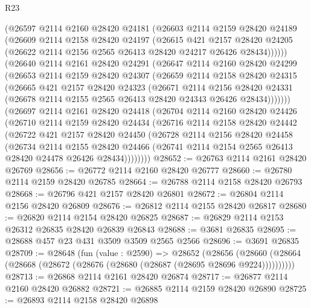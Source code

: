 \begin{lexlean}{R23}
\begin{coremodule}
      (@26597
        @2114
        @2160
        @28420
        @24181
        (@26603
          @2114
          @2159
          @28420
          @24189
          (@26609
            @2114
            @2158
            @28420
            @24197
            (@26615
              @421
              @2157
              @28420
              @24205
              (@26622 @2114 @2156 @2565 @26413 @28420 @24217 @26426 @28434))))))
    (@26640
      @2114
      @2161
      @28420
      @24291
      (@26647
        @2114
        @2160
        @28420
        @24299
        (@26653
          @2114
          @2159
          @28420
          @24307
          (@26659
            @2114
            @2158
            @28420
            @24315
            (@26665
              @421
              @2157
              @28420
              @24323
              (@26671
                @2114
                @2156
                @28420
                @24331
                (@26678 @2114 @2155 @2565 @26413 @28420 @24343 @26426 @28434)))))))
    (@26697
      @2114
      @2161
      @28420
      @24418
      (@26704
        @2114
        @2160
        @28420
        @24426
        (@26710
          @2114
          @2159
          @28420
          @24434
          (@26716
            @2114
            @2158
            @28420
            @24442
            (@26722
              @421
              @2157
              @28420
              @24450
              (@26728
                @2114
                @2156
                @28420
                @24458
                (@26734
                  @2114
                  @2155
                  @28420
                  @24466
                  (@26741 @2114 @2154 @2565 @26413 @28420 @24478 @26426 @28434))))))))
@28652 := @26763 @2114 @2161 @28420 @26769
@28656 := @26772 @2114 @2160 @28420 @26777
@28660 := @26780 @2114 @2159 @28420 @26785
@28664 := @26788 @2114 @2158 @28420 @26793
@28668 := @26796 @421 @2157 @28420 @26801
@28672 := @26804 @2114 @2156 @28420 @26809
@28676 := @26812 @2114 @2155 @28420 @26817
@28680 := @26820 @2114 @2154 @28420 @26825
@28687 := @26829 @2114 @2153 @26312 @26835 @28420 @26839 @26843
@28688 := @3681 @26835
@28695 := @28688 @457 @23 @431 @3509 @3509 @2565 @2566
@28696 := @3691 @26835
@28709 := @28648
    (fun (value : @2590) =>
    @28652
      (@28656 (@28660 (@28664 (@28668 (@28672 (@28676 (@28680 (@28687 (@28695 @28696 @9224))))))))))
@28713 := @26868 @2114 @2161 @28420 @26874
@28717 := @26877 @2114 @2160 @28420 @26882
@28721 := @26885 @2114 @2159 @28420 @26890
@28725 := @26893 @2114 @2158 @28420 @26898

\end{coremodule}
\end{lexlean}
